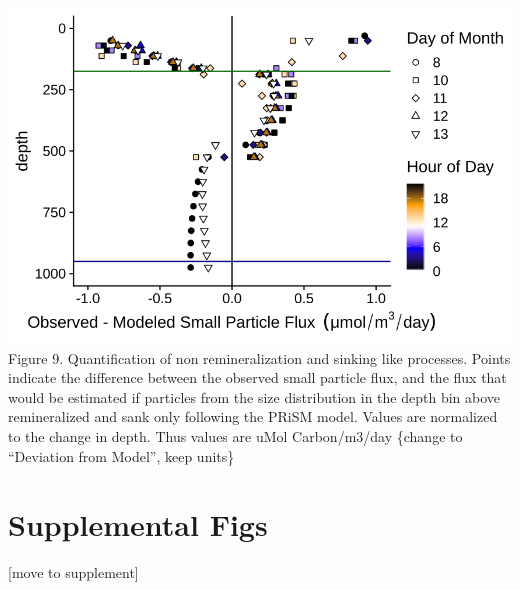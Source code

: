 \documentclass[]{article}
\begin{document}
\includegraphics{../figures/FluxSizeShift.svg} Figure 9. Quantification
of non remineralization and sinking like processes. Points indicate the
difference between the observed small particle flux, and the flux that
would be estimated if particles from the size distribution in the depth
bin above remineralized and sank only following the PRiSM model. Values
are normalized to the change in depth. Thus values are uMol
Carbon/m3/day \{change to ``Deviation from Model'', keep units\}

\hypertarget{supplemental-figs}{%
\section{Supplemental Figs}\label{supplemental-figs}}

{[}move to supplement{]}
\end{document}
